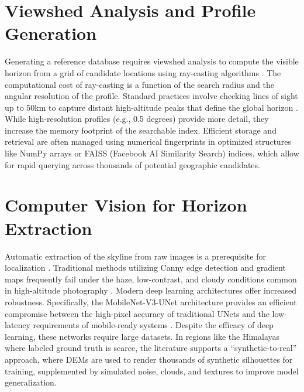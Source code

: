 \section{Viewshed Analysis and Profile Generation}
Generating a reference database requires viewshed analysis to compute the visible horizon from a grid of candidate locations using ray-casting algorithms \cite{tzeng2013user, steger2022horayzon}. The computational cost of ray-casting is a function of the search radius and the angular resolution of the profile. Standard practices involve checking lines of sight up to 50km to capture distant high-altitude peaks that define the global horizon \cite{baatz2012large, steger2022horayzon}. While high-resolution profiles (e.g., 0.5 degrees) provide more detail, they increase the memory footprint of the searchable index. Efficient storage and retrieval are often managed using numerical fingerprints in optimized structures like NumPy arrays or FAISS (Facebook AI Similarity Search) indices, which allow for rapid querying across thousands of potential geographic candidates.

\section{Computer Vision for Horizon Extraction}
Automatic extraction of the skyline from raw images is a prerequisite for localization \cite{norinder2025panoramic, yang2025yunet}. Traditional methods utilizing Canny edge detection and gradient maps frequently fail under the haze, low-contrast, and cloudy conditions common in high-altitude photography \cite{baatz2012large, yang2025yunet}. Modern deep learning architectures offer increased robustness. Specifically, the MobileNet-V3-UNet architecture provides an efficient compromise between the high-pixel accuracy of traditional UNets and the low-latency requirements of mobile-ready systems \cite{yang2025yunet}. Despite the efficacy of deep learning, these networks require large datasets. In regions like the Himalayas where labeled ground truth is scarce, the literature supports a ``synthetic-to-real'' approach, where DEMs are used to render thousands of synthetic silhouettes for training, supplemented by simulated noise, clouds, and textures to improve model generalization.


